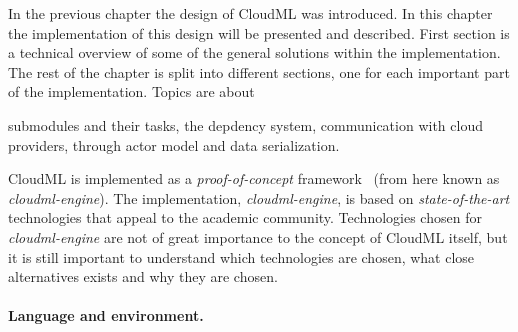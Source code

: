 
In the previous chapter the design of CloudML was introduced.
In this chapter the implementation of this design will be presented and described.
First section is a technical overview of some of the general solutions within 
the implementation.
The rest of the chapter is split into different sections, one for each important part of the implementation.
Topics are about
\begin{ii}
  \iitem submodules and their tasks,
  \iitem the depdency system,
  \iitem communication with cloud providers,
  \iitem {} through actor model and
  \iitem data serialization.
\end{ii}


CloudML is implemented as a \emph{proof-of-concept} framework~\cite{cloudml-engine}
(from here known as \emph{cloudml-engine}). 
The implementation, \emph{cloudml-engine}, 
is based on \emph{state-of-the-art} technologies that appeal to the academic community.
Technologies chosen for \emph{cloudml-engine} are not of great importance to the concept of CloudML itself,
but it is still important to understand which technologies are chosen, what close alternatives exists
and why they are chosen.

\paragraph{Language and environment.} 

